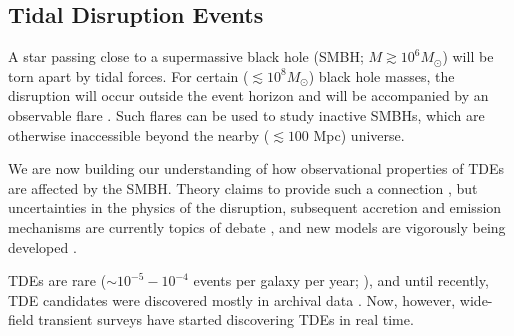 %
%
%
%

\subsection{Tidal Disruption Events}
\def\secname{\chpname:tdes}\label{sec:\secname}


A star passing close to a supermassive black hole (SMBH;
$M\gtrsim10^{6}M_{\odot}$) will be torn apart by tidal forces. For
certain ($\lesssim10^{8}M_{\odot}$) black hole masses, the disruption
will occur outside the event horizon and will be accompanied by an
observable flare \citep{Hills1975, Rees1988}. Such flares can be used to
study inactive SMBHs, which are otherwise inaccessible beyond the nearby
($\lesssim100$ Mpc) universe.

We are now building our understanding of how observational properties of
TDEs are affected by the SMBH. Theory claims to provide such a
connection \citep[e.g.][]{Lodato2009, Guillochon2014}, but uncertainties
in the physics of the disruption, subsequent accretion and emission
mechanisms are currently topics of debate \citep[e.g.][]{Strubbe2015,
Guillochon2014, Roth2015}, and new models are vigorously being developed
\citep[e.g.][]{Piran2015, Hayasaki2015, Svirski2015, Bonnerot2015}.

TDEs are rare ($\sim10^{-5}-10^{-4}$ events per galaxy per year;
\citealp{Wang2004, Stone2015}), and until recently, TDE candidates were
discovered mostly in archival data \citep[e.g.][]{Donley2002,
Gezari2006, Esquej2007}. Now, however, wide-field transient surveys have
started discovering TDEs in real time.

